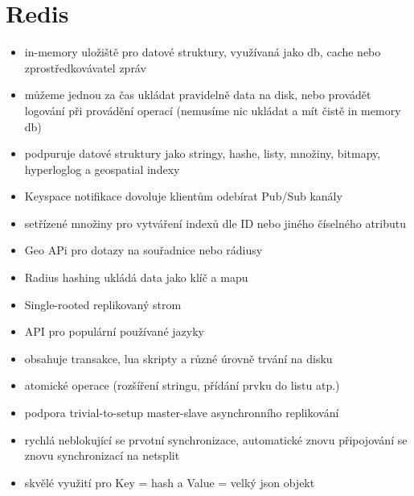 \documentclass[czech,bachelor,dept460,male,csharp,cpdeclaration]{diploma}
\begin{document}
		\section{Redis}
			\begin{itemize}
				\item in-memory uložiště pro datové struktury, využívaná jako db, cache nebo zprostředkovávatel zpráv
				\item můžeme jednou za čas ukládat pravidelně data na disk, nebo provádět logování při provádění operací (nemusíme nic ukládat a mít čistě in memory db)
				\item podpuruje datové struktury jako stringy, hashe, listy, množiny, bitmapy, hyperloglog a geospatial indexy
				\item Keyspace notifikace dovoluje klientům odebírat Pub/Sub kanály
				\item setřízené množiny pro vytváření indexů dle ID nebo jiného číselného atributu
				\item Geo APi pro dotazy na souřadnice nebo rádiusy
				\item Radius hashing ukládá data jako klíč a mapu
				\item Single-rooted replikovaný strom
				\item API pro populární používané jazyky
				\item obsahuje transakce, lua skripty a různé úrovně trvání na disku
				\item atomické operace (rozšíření stringu, přídání prvku do listu atp.)
				\item podpora trivial-to-setup master-slave asynchronního replikování
				\item rychlá neblokující se prvotní synchronizace, automatické znovu připojování se znovu synchronizací na netsplit
				\item skvělé využití pro Key = hash a Value = velký json objekt
			\end{itemize}
		
\end{document}
